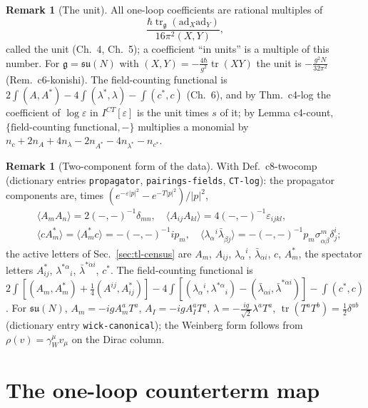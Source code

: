 \documentclass[11pt]{article}
\numberwithin{equation}{section}
\theoremstyle{plain}
\theoremstyle{definition}
\newtheorem{remark}[theorem]{Remark}
\begin{document}
\begin{remark}[The unit]
All one-loop coefficients are rational multiples of
\[
\frac{\hbar\operatorname{tr}_{\mathfrak g}(\mathrm{ad}_X\mathrm{ad}_Y)}{16\pi^2(X,Y)},
\]
called the unit (Ch.~4, Ch.~5); a coefficient ``in units'' is a multiple of this number. For $\mathfrak g=\mathfrak{su}(N)$ with $(X,Y)=-\tfrac{4\hbar}{g^2}\operatorname{tr}(XY)$ the unit is $-\tfrac{g^2N}{32\pi^2}$ (Rem.~c6-konishi). The field-counting functional is $2\int(A,A^*)-4\int(\lambda^*,\lambda)-\int(c^*,c)$ (Ch.~6), and by Thm.~c4-log the coefficient of $\log\varepsilon$ in $I^{CT}[\varepsilon]$ is the unit times $s$ of it; by Lemma c4-count, $\{\text{field-counting functional},-\}$ multiplies a monomial by $n_c+2n_A+4n_\lambda-2n_{A^*}-4n_{\lambda^*}-n_{c^*}$.
\end{remark}

\begin{remark}[Two-component form of the data]
\label{rem:tl-twocomp0}
With Def.~c8-twocomp (dictionary entries \texttt{propagator}, \texttt{pairings-fields}, \texttt{CT-log}): the propagator components are, times $(e^{-\varepsilon|p|^2}-e^{-T|p|^2})/|p|^2$,
\[
\begin{aligned}&\langle A_mA_n\rangle=2(-,-)^{-1}\delta_{mn},\quad \langle A_{ij}A_{kl}\rangle=4(-,-)^{-1}\varepsilon_{ijkl},\\ &\langle cA^*_m\rangle=\langle A^*_mc\rangle=-(-,-)^{-1}ip_m,\quad \langle\lambda_\alpha{}^i\bar\lambda_{\dot\beta j}\rangle=-(-,-)^{-1}p_m\sigma^m_{\alpha\dot\beta}\delta^i_j ;\end{aligned}
\]
the active letters of Sec.~\ref{sec:tl-census} are $A_m$, $A_{ij}$, $\lambda_\alpha{}^i$, $\bar\lambda_{\dot\alpha i}$, $c$, $A^*_m$, the spectator letters $A^*_{ij}$, $\lambda^{*\alpha}{}_i$, $\bar\lambda^{*\dot\alpha i}$, $c^*$. The field-counting functional is $2\int[(A_m,A^*_m)+\tfrac14(A^{ij},A^*_{ij})]-4\int[(\lambda_\alpha{}^i,\lambda^{*\alpha}{}_i)-(\bar\lambda_{\dot\alpha i},\bar\lambda^{*\dot\alpha i})]-\int(c^*,c)$. For $\mathfrak{su}(N)$, $A_m=-igA_m^aT^a$, $A_I=-igA_I^aT^a$, $\lambda=-\tfrac{ig}{\sqrt2}\lambda^aT^a$, $\operatorname{tr}(T^aT^b)=\tfrac12\delta^{ab}$ (dictionary entry \texttt{wick-canonical}); the Weinberg form follows from $\rho(v)=\gamma_W^\mu v_\mu$ on the Dirac column.
\end{remark}


\section{The one-loop counterterm map}
\label{sec:tl-map}
\end{document}
